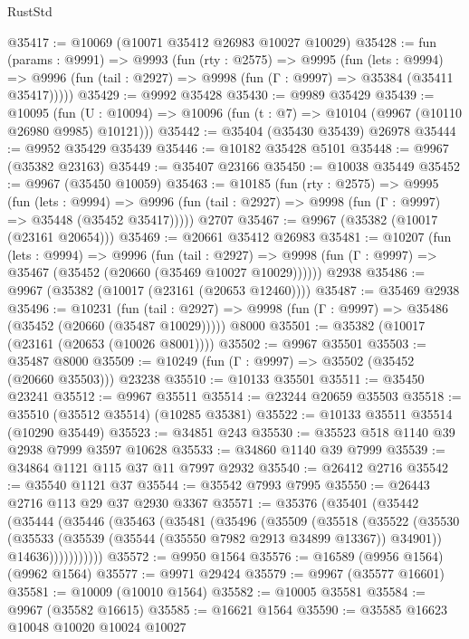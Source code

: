 \begin{lexlean}{RustStd}
\begin{coremodule}
@35417 := @10069 (@10071 @35412 @26983 @10027 @10029)
@35428 := fun (params : @9991) =>
  @9993
    (fun (rty : @2575) =>
    @9995
      (fun (lets : @9994) =>
      @9996 (fun (tail : @2927) => @9998 (fun (Γ : @9997) => @35384 (@35411 @35417)))))
@35429 := @9992 @35428
@35430 := @9989 @35429
@35439 := @10095
    (fun (U : @10094) => @10096 (fun (t : @7) => @10104 (@9967 (@10110 @26980 @9985) @10121)))
@35442 := @35404 (@35430 @35439) @26978
@35444 := @9952 @35429 @35439
@35446 := @10182 @35428 @5101
@35448 := @9967 (@35382 @23163)
@35449 := @35407 @23166
@35450 := @10038 @35449
@35452 := @9967 (@35450 @10059)
@35463 := @10185
    (fun (rty : @2575) =>
    @9995
      (fun (lets : @9994) =>
      @9996 (fun (tail : @2927) => @9998 (fun (Γ : @9997) => @35448 (@35452 @35417)))))
    @2707
@35467 := @9967 (@35382 (@10017 (@23161 @20654)))
@35469 := @20661 @35412 @26983
@35481 := @10207
    (fun (lets : @9994) =>
    @9996
      (fun (tail : @2927) =>
      @9998 (fun (Γ : @9997) => @35467 (@35452 (@20660 (@35469 @10027 @10029))))))
    @2938
@35486 := @9967 (@35382 (@10017 (@23161 (@20653 @12460))))
@35487 := @35469 @2938
@35496 := @10231
    (fun (tail : @2927) => @9998 (fun (Γ : @9997) => @35486 (@35452 (@20660 (@35487 @10029)))))
    @8000
@35501 := @35382 (@10017 (@23161 (@20653 (@10026 @8001))))
@35502 := @9967 @35501
@35503 := @35487 @8000
@35509 := @10249 (fun (Γ : @9997) => @35502 (@35452 (@20660 @35503))) @23238
@35510 := @10133 @35501
@35511 := @35450 @23241
@35512 := @9967 @35511
@35514 := @23244 @20659 @35503
@35518 := @35510 (@35512 @35514) (@10285 @35381)
@35522 := @10133 @35511 @35514 (@10290 @35449)
@35523 := @34851 @243
@35530 := @35523 @518 @1140 @39 @2938 @7999 @3597 @10628
@35533 := @34860 @1140 @39 @7999
@35539 := @34864 @1121 @115 @37 @11 @7997 @2932
@35540 := @26412 @2716
@35542 := @35540 @1121 @37
@35544 := @35542 @7993 @7995
@35550 := @26443 @2716 @113 @29 @37 @2930 @3367
@35571 := @35376
    (@35401
      (@35442
        (@35444
          (@35446
            (@35463
              (@35481
                (@35496
                  (@35509
                    (@35518
                      (@35522
                        (@35530
                          (@35533 (@35539 (@35544 (@35550 @7982 @2913 @34899 @13367)) @34901))
                          @14636)))))))))))
@35572 := @9950 @1564
@35576 := @16589 (@9956 @1564) (@9962 @1564)
@35577 := @9971 @29424
@35579 := @9967 (@35577 @16601)
@35581 := @10009 (@10010 @1564)
@35582 := @10005 @35581
@35584 := @9967 (@35582 @16615)
@35585 := @16621 @1564
@35590 := @35585 @16623 @10048 @10020 @10024 @10027

\end{coremodule}
\end{lexlean}
